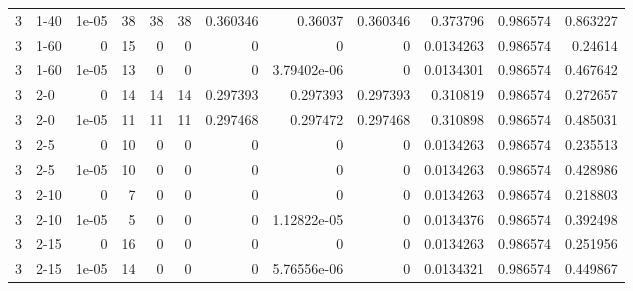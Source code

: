 \begin{tabular}{rlrrrrrrrrrr}
     3 & 1-40   &      1e-05 &          38 &                38 &                38 &     0.360346    &     0.36037     &      0.360346    &        0.373796  &               0.986574 &           0.863227 \\
     3 & 1-60   &      0     &          15 &                 0 &                 0 &     0           &     0           &      0           &        0.0134263 &               0.986574 &           0.24614  \\
     3 & 1-60   &      1e-05 &          13 &                 0 &                 0 &     0           &     3.79402e-06 &      0           &        0.0134301 &               0.986574 &           0.467642 \\
     3 & 2-0    &      0     &          14 &                14 &                14 &     0.297393    &     0.297393    &      0.297393    &        0.310819  &               0.986574 &           0.272657 \\
     3 & 2-0    &      1e-05 &          11 &                11 &                11 &     0.297468    &     0.297472    &      0.297468    &        0.310898  &               0.986574 &           0.485031 \\
     3 & 2-5    &      0     &          10 &                 0 &                 0 &     0           &     0           &      0           &        0.0134263 &               0.986574 &           0.235513 \\
     3 & 2-5    &      1e-05 &          10 &                 0 &                 0 &     0           &     0           &      0           &        0.0134263 &               0.986574 &           0.428986 \\
     3 & 2-10   &      0     &           7 &                 0 &                 0 &     0           &     0           &      0           &        0.0134263 &               0.986574 &           0.218803 \\
     3 & 2-10   &      1e-05 &           5 &                 0 &                 0 &     0           &     1.12822e-05 &      0           &        0.0134376 &               0.986574 &           0.392498 \\
     3 & 2-15   &      0     &          16 &                 0 &                 0 &     0           &     0           &      0           &        0.0134263 &               0.986574 &           0.251956 \\
     3 & 2-15   &      1e-05 &          14 &                 0 &                 0 &     0           &     5.76556e-06 &      0           &        0.0134321 &               0.986574 &           0.449867 \\

\end{tabular}
